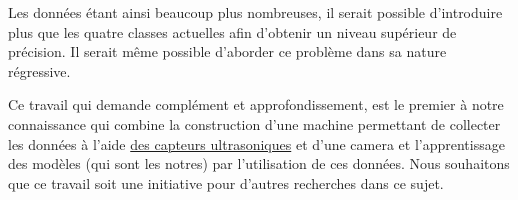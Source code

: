 Les données étant ainsi beaucoup plus nombreuses, il serait possible d'introduire plus
que les quatre classes actuelles afin d'obtenir un niveau supérieur
de précision. Il serait même possible d'aborder ce problème dans sa nature régressive.

Ce travail qui demande complément et approfondissement, est le
premier à notre connaissance qui combine la construction d'une machine
permettant de collecter les données à l'aide \underline{des capteurs ultrasoniques}
et d'une camera et l'apprentissage des modèles (qui sont les notres)
par l'utilisation de ces données. Nous souhaitons que ce travail soit une initiative pour d'autres
recherches dans ce sujet.
